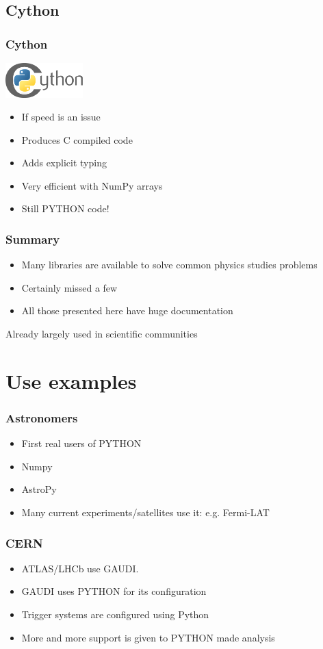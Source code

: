 \documentclass[14pt]{beamer}
\begin{document}
\subsection{Cython}
\begin{frame}
\frametitle{Cython}
\centering
\includegraphics[width=3cm]{Cython-logo.png}
\begin{itemize}
\item If speed is an issue
\item Produces C compiled code
\item Adds explicit typing
\item Very efficient with NumPy arrays
\item Still PYTHON code!
\end{itemize}
\end{frame}

\begin{frame}
\frametitle{Summary}
\begin{itemize}
\item Many libraries are available to solve common physics studies problems
\item Certainly missed a few
\item All those presented here have huge documentation
\end{itemize}
\alert{Already largely used in scientific communities}
\end{frame}

\section{Use examples}

\begin{frame}
\frametitle{Astronomers}
\begin{itemize}
\item First real users of PYTHON
\item Numpy
\item AstroPy
\item Many current experiments/satellites use it: e.g. Fermi-LAT
\end{itemize}
\end{frame}

\begin{frame}
\frametitle{CERN}
\begin{itemize}
\item ATLAS/LHCb use GAUDI.
\item GAUDI uses PYTHON for its configuration
\item Trigger systems are configured using Python
\item More and more support is given to PYTHON made analysis
\end{itemize}
\end{frame}
\end{document}
